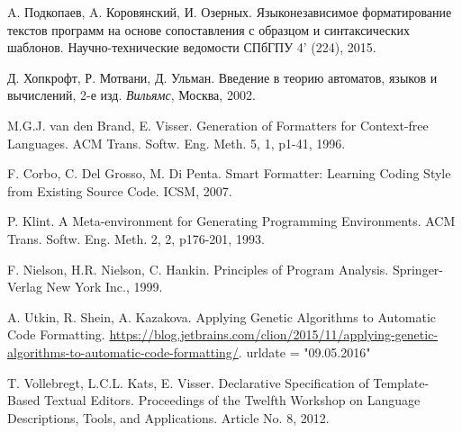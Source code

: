\begin{thebibliography}{99}

  A. Подкопаев, A. Коровянский, И. Озерных.
  Языконезависимое форматирование текстов программ на основе сопоставления с образцом и синтаксических шаблонов.
  Научно-технические ведомости СПбГПУ 4' (224), 2015.

  Д. Хопкрофт, Р. Мотвани, Д. Ульман.
  Введение в теорию автоматов, языков и вычислений, 2-е изд.
  \emph{Вильямс}, Москва, 2002.

  M.G.J. van den Brand,  E. Visser.
  Generation of Formatters for Context-free Languages.
  ACM Trans. Softw. Eng. Meth. 5, 1, p1-41, 1996.

  F. Corbo, C. Del Grosso, M. Di Penta.
  Smart Formatter: Learning Coding Style from Existing Source Code.
  ICSM, 2007.

  P. Klint.
  A Meta-environment for Generating Programming Environments.
  ACM Trans. Softw. Eng. Meth. 2, 2, p176-201, 1993.

  F. Nielson, H.R. Nielson, C. Hankin.
  Principles of Program Analysis.
  Springer-Verlag New York Inc., 1999.

  A. Utkin, R. Shein, A. Kazakova.
  Applying Genetic Algorithms to Automatic Code Formatting.
  \url{https://blog.jetbrains.com/clion/2015/11/applying-genetic-algorithms-to-automatic-code-formatting/}.
  urldate      = "09.05.2016"

  T. Vollebregt, L.C.L. Kats, E. Visser.
  Declarative Specification of Template-Based Textual Editors.
  Proceedings of the Twelfth Workshop on Language Descriptions, Tools, and Applications. Article No. 8, 2012.

\end{thebibliography}
